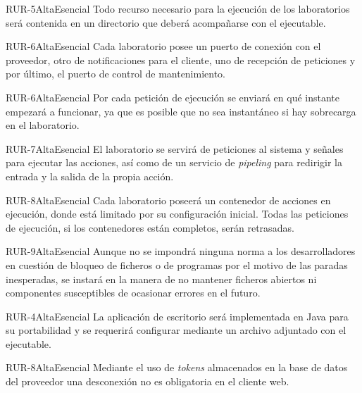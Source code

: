 {RUR-5}{Alta}{Esencial}
{
Todo recurso necesario para la ejecución de los laboratorios será 
contenida en un directorio que deberá acompañarse con el ejecutable.
}

{RUR-6}{Alta}{Esencial}
{
Cada laboratorio posee un puerto de conexión con el proveedor, otro de 
notificaciones para el cliente, uno de recepción de peticiones y por 
último, el puerto de control de mantenimiento.
}

{RUR-6}{Alta}{Esencial}
{
Por cada petición de ejecución se enviará en qué instante empezará 
a funcionar, ya que es posible que no sea instantáneo si hay 
sobrecarga en el laboratorio.
}

{RUR-7}{Alta}{Esencial}
{
El laboratorio se servirá de peticiones al sistema y señales para 
ejecutar las acciones, así como de un servicio de \emph{pipeling} para 
redirigir la entrada y la salida de la propia acción.
}

{RUR-8}{Alta}{Esencial}
{
Cada laboratorio poseerá un contenedor de acciones en ejecución, donde 
está limitado por su configuración inicial. Todas las peticiones de 
ejecución, si los contenedores están completos, serán retrasadas.
}

{RUR-9}{Alta}{Esencial}
{
Aunque no se impondrá ninguna norma a los desarrolladores en cuestión 
de bloqueo de ficheros o de programas por el motivo de las paradas 
inesperadas, se instará en la manera de no mantener ficheros abiertos 
ni componentes susceptibles de ocasionar errores en el futuro.
}

{RUR-4}{Alta}{Esencial}
{
La aplicación de escritorio será implementada en Java para su 
portabilidad y se requerirá configurar mediante un archivo adjuntado 
con el ejecutable.
}

{RUR-8}{Alta}{Esencial}
{
Mediante el uso de \emph{tokens} almacenados en la base de datos del 
proveedor una desconexión no es obligatoria en el cliente web.
}
